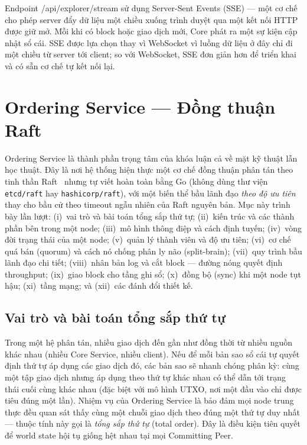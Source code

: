 Endpoint /api/explorer/stream sử dụng Server-Sent Events (SSE) --- một
cơ chế cho phép server đẩy dữ liệu một chiều xuống trình duyệt qua một kết nối
HTTP được giữ mở. Mỗi khi có block hoặc giao dịch mới, Core phát ra một sự kiện
cập nhật sổ cái. SSE được lựa chọn thay vì WebSocket vì luồng dữ liệu ở đây chỉ
đi một chiều từ server tới client; so với WebSocket, SSE đơn giản hơn để triển
khai và có sẵn cơ chế tự kết nối lại.

\section{Ordering Service --- Đồng thuận Raft}
\label{sec:ordering-service}


Ordering Service là thành phần trọng tâm của khóa luận cả về mặt kỹ thuật lẫn học
thuật. Đây là nơi hệ thống hiện thực một cơ chế đồng thuận phân tán theo
tinh thần Raft~\cite{ongaro2014raft} nhưng tự viết hoàn toàn bằng Go
(không dùng thư viện \texttt{etcd/raft} hay \texttt{hashicorp/raft}), với một biến
thể bầu lãnh đạo \textit{theo độ ưu tiên} thay cho bầu cử theo timeout ngẫu nhiên
của Raft nguyên bản. Mục này trình bày lần lượt: (i)~vai trò và bài toán tổng sắp
thứ tự; (ii)~kiến trúc và các thành phần bên trong một node; (iii)~mô hình thông
điệp và cách định tuyến; (iv)~vòng đời trạng thái của một node; (v)~quản lý thành
viên và độ ưu tiên; (vi)~cơ chế quá bán (quorum) và cách nó chống phân ly não
(split-brain); (vii)~quy trình bầu lãnh đạo chi tiết; (viii)~nhân bản log và cắt
block --- đường nóng quyết định throughput; (ix)~giao block cho tầng ghi sổ;
(x)~đồng bộ (sync) khi một node tụt hậu; (xi)~tầng mạng; và (xii)~các đánh đổi
thiết kế.

\subsection{Vai trò và bài toán tổng sắp thứ tự}
\label{sec:ordering-role}

Trong một hệ phân tán, nhiều giao dịch đến gần như đồng thời từ nhiều nguồn khác
nhau (nhiều Core Service, nhiều client). Nếu để mỗi bản sao sổ cái tự quyết định
thứ tự áp dụng các giao dịch đó, các bản sao sẽ nhanh chóng phân kỳ: cùng một tập
giao dịch nhưng áp dụng theo thứ tự khác nhau có thể dẫn tới trạng thái cuối cùng
khác nhau (đặc biệt với mô hình UTXO, nơi một đầu vào chỉ được tiêu đúng một lần).
Nhiệm vụ của Ordering Service là bảo đảm mọi node trung thực đều quan sát
thấy cùng một chuỗi giao dịch theo đúng một thứ tự duy nhất --- thuộc tính này
gọi là \textit{tổng sắp thứ tự} (total order). Đây là điều kiện tiên quyết để
world state hội tụ giống hệt nhau tại mọi Committing Peer.

